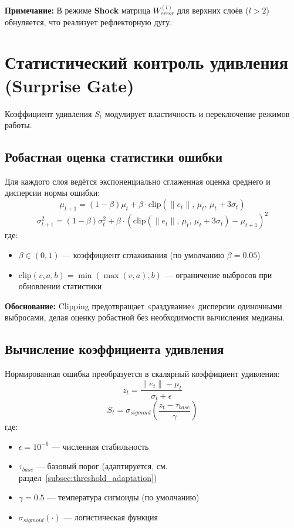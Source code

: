 \textbf{Примечание:} В режиме \textbf{Shock} матрица $W_{error}^{(l)}$ для верхних слоёв ($l > 2$) обнуляется, что реализует рефлекторную дугу.

\section{Статистический контроль удивления (Surprise Gate)}
\label{sec:surprise_gate}

Коэффициент удивления $S_t$ модулирует пластичность и переключение режимов работы.

\subsection{Робастная оценка статистики ошибки}

Для каждого слоя ведётся экспоненциально сглаженная оценка среднего и дисперсии нормы ошибки:
\begin{equation}
\mu_{t+1} = (1 - \beta) \mu_t + \beta \cdot \text{clip}\left(\|e_t\|, \, \mu_t, \, \mu_t + 3\sigma_t\right)
\label{eq:mu_update}
\end{equation}
\begin{equation}
\sigma_{t+1}^2 = (1 - \beta) \sigma_t^2 + \beta \cdot \left(\text{clip}\left(\|e_t\|, \, \mu_t, \, \mu_t + 3\sigma_t\right) - \mu_{t+1}\right)^2
\label{eq:sigma_update}
\end{equation}
где:
\begin{itemize}
    \item $\beta \in (0, 1)$ — коэффициент сглаживания (по умолчанию $\beta = 0.05$)
    \item $\text{clip}(v, a, b) = \min(\max(v, a), b)$ — ограничение выбросов при обновлении статистики
\end{itemize}

\textbf{Обоснование:} Clipping предотвращает «раздувание» дисперсии одиночными выбросами, делая оценку робастной без необходимости вычисления медианы.

\subsection{Вычисление коэффициента удивления}

Нормированная ошибка преобразуется в скалярный коэффициент удивления:
\begin{equation}
z_t = \frac{\|e_t\| - \mu_t}{\sigma_t + \epsilon}
\label{eq:z_score}
\end{equation}
\begin{equation}
S_t = \sigma_{sigmoid}\left(\frac{z_t - \tau_{base}}{\gamma}\right)
\label{eq:surprise}
\end{equation}
где:
\begin{itemize}
    \item $\epsilon = 10^{-6}$ — численная стабильность
    \item $\tau_{base}$ — базовый порог (адаптируется, см. раздел~\ref{subsec:threshold_adaptation})
    \item $\gamma = 0.5$ — температура сигмоиды (по умолчанию)
    \item $\sigma_{sigmoid}(\cdot)$ — логистическая функция
\end{itemize}

